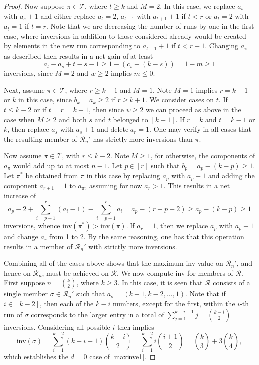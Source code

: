 \documentclass[11pt,a4paper]{article}
\begin{document}
\begin{proof}
 Now suppose $\pi \in \mathcal{T}$, where $t \geq k$ and $M=2$.  In this case, we replace $a_s$ with $a_s+1$ and either replace $a_t=2,\,a_{t+1}$ with $a_{t+1}+1$ if $t<r$ or $a_t=2$ with $a_t=1$ if $t=r$.  Note that we are decreasing the number of runs by one in the first case, where inversions in addition to those considered already would be created by elements in the new run corresponding to $a_{t+1}+1$ if $t<r-1$.  Changing $a_\pi$ as described then results in a net gain of at least
 $$a_t-a_s+t-s-1\geq 1-(a_s-(k-s))=1-m\geq 1$$
 inversions, since $M=2$ and $w \geq 2$ implies $m \leq 0$.

 Next, assume $ \pi \in \mathcal{T}$, where  $r \geq k-1$ and $M=1$.  Note $M=1$ implies $r=k-1$ or $k$ in this case, since $b_k=a_k\geq 2$ if $r \geq k+1$. We consider cases on $t$.  If $t \leq k-2$ or if $t=r=k-1$, then since $w \geq 2$ we can proceed as above in the case when $M \geq 2$ and both $s$ and $t$ belonged to $[k-1]$.  If $r=k$ and $t=k-1$ or $k$, then replace $a_s$ with $a_s+1$ and delete $a_r=1$.  One may verify in all cases that the resulting member of $\mathcal{R}_n'$ has strictly more inversions than $\pi$.

 Now assume $\pi \in \mathcal{T}$, with $r \leq k-2$.  Note $M\geq 1$, for otherwise, the components of $a_\pi$ would add up to at most $n-1$.  Let $p \in [r]$ such that $b_p=a_p-(k-p)\geq 1$.  Let $\pi^*$ be obtained from $\pi$ in this case by replacing $a_p$ with $a_p-1$ and adding the component $a_{r+1}=1$ to $a_\pi$, assuming for now $a_r>1$.  This results in a net increase of
 $$a_p-2+\sum_{i=p+1}^r(a_i-1)-\sum_{i=p+1}^ra_i=a_p-(r-p+2)\geq a_p-(k-p)\geq 1$$
 inversions, whence $\text{inv}(\pi^*)>\text{inv}(\pi)$.  If $a_r=1$, then we replace $a_p$ with $a_p-1$ and change $a_r$ from 1 to 2.  By the same reasoning, one has that this operation results in a member of $\mathcal{R}_n'$ with strictly more inversions.

 Combining all of the cases above shows that the maximum inv value on $\mathcal{R}_n'$, and hence on $\mathcal{R}_n$, must be achieved on $\mathcal{R}$.  We now compute inv for members of $\mathcal{R}$.  First suppose $n=\binom{k}{2}$, where $k \geq 3$. In this case, it is seen that $\mathcal{R}$ consists of a single member $\sigma \in \mathcal{R}_n'$ such that $a_\sigma=(k-1,k-2,\ldots,1)$.  Note that if $i \in [k-2]$, then each of the $k-i$ numbers, except for the first, within the $i$-th run of $\sigma$ corresponds to the larger entry in a total of $\sum_{j=1}^{k-i-1}j=\binom{k-i}{2}$ inversions.  Considering all possible $i$ then implies
 $$\text{inv}(\sigma)=\sum_{i=1}^{k-2}(k-i-1)\binom{k-i}{2}=\sum_{i=1}^{k-2}i\binom{i+1}{2}=\binom{k}{3}+3\binom{k}{4},$$
 which establishes the $d=0$ case of \eqref{maxinve1}.


\end{proof}
\end{document}
